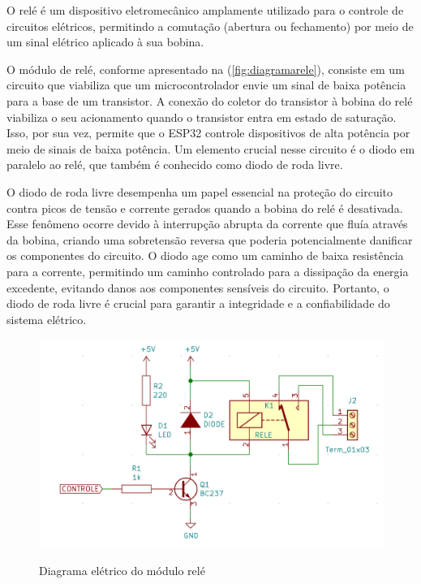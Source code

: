 O relé é um dispositivo eletromecânico amplamente utilizado para o controle 
de circuitos elétricos, permitindo a comutação (abertura ou fechamento) 
por meio de um sinal elétrico aplicado à sua bobina.

O módulo de relé, conforme apresentado na (\autoref{fig:diagramarele}), 
consiste em um circuito que viabiliza que um microcontrolador 
envie um sinal de baixa potência para a base de um transistor. A conexão do 
coletor do transistor à bobina do relé viabiliza o seu acionamento 
quando o transistor entra em estado de saturação. Isso, por sua vez, permite que o ESP32 
controle dispositivos de alta potência por meio de sinais de baixa potência. 
Um elemento crucial nesse circuito é o diodo em paralelo ao relé, 
que também é conhecido como diodo de roda livre.

O diodo de roda livre desempenha um papel essencial na proteção do 
circuito contra picos de tensão e corrente gerados quando a bobina 
do relé é desativada. Esse fenômeno ocorre devido à interrupção 
abrupta da corrente que fluía através da bobina, criando uma sobretensão 
reversa que poderia potencialmente danificar os componentes do circuito. 
O diodo age como um caminho de baixa resistência para a corrente, 
permitindo um caminho controlado para a dissipação da energia excedente, 
evitando danos aos componentes sensíveis do circuito. Portanto, o diodo 
de roda livre é crucial para garantir a integridade e a confiabilidade 
do sistema elétrico.

\begin{figure}[h!]
    \centering
    \caption{Diagrama elétrico do módulo relé}
    \includegraphics[scale=0.2]{figuras/modulo_rele_esquema.png}
    \fonte{}%
    \label{fig:diagramarele}
    \centering
\end{figure}

